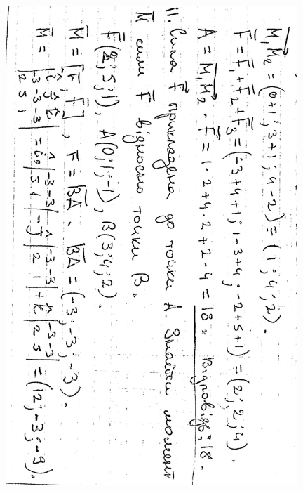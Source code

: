\documentclass{article}
\begin{document}
\includegraphics[width=11cm,angle=90]{ons/14.jpg}\\
\end{document}
